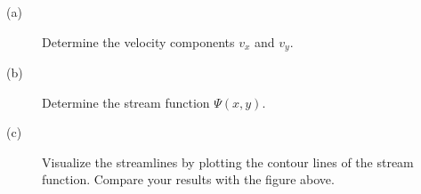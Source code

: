 \documentclass[a4paper, 10pt]{article}
\begin{document}
\begin{description}
	\item[(a)]
	Determine the velocity components $v_x$ and $v_y$.
	\item[(b)]
	Determine the stream function $\Psi(x,y)$.
	\item[(c)]
	Visualize the streamlines by plotting the contour lines of the stream function. Compare your results with the figure above.
\end{description}
\end{document}
